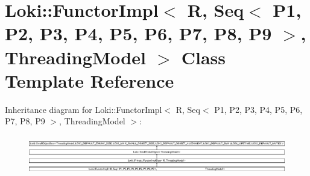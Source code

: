 \hypertarget{classLoki_1_1FunctorImpl_3_01R_00_01Seq_3_01P1_00_01P2_00_01P3_00_01P4_00_01P5_00_01P6_00_01P7_0a9743783bda060bdf3a291ac31cfafe2}{}\section{Loki\+:\+:Functor\+Impl$<$ R, Seq$<$ P1, P2, P3, P4, P5, P6, P7, P8, P9 $>$, Threading\+Model $>$ Class Template Reference}
\label{classLoki_1_1FunctorImpl_3_01R_00_01Seq_3_01P1_00_01P2_00_01P3_00_01P4_00_01P5_00_01P6_00_01P7_0a9743783bda060bdf3a291ac31cfafe2}
Inheritance diagram for Loki\+:\+:Functor\+Impl$<$ R, Seq$<$ P1, P2, P3, P4, P5, P6, P7, P8, P9 $>$, Threading\+Model $>$\+:\begin{figure}[H]
\begin{center}
\leavevmode
\includegraphics[height=1.751368cm]{classLoki_1_1FunctorImpl_3_01R_00_01Seq_3_01P1_00_01P2_00_01P3_00_01P4_00_01P5_00_01P6_00_01P7_0a9743783bda060bdf3a291ac31cfafe2}
\end{center}
\end{figure}
